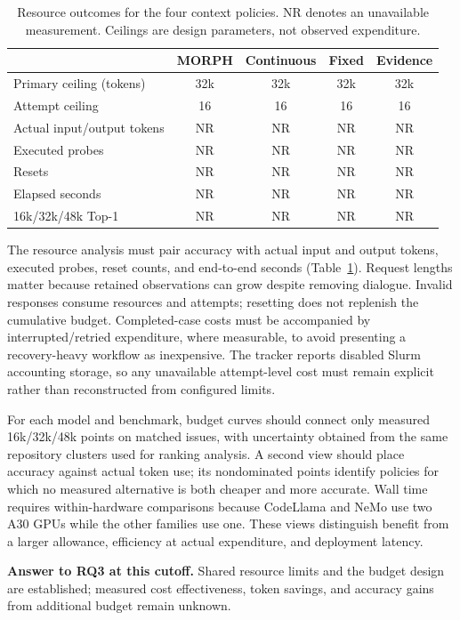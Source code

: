 \documentclass[letterpaper,journal]{IEEEtran}
\begin{document}
\begin{table}[t]
\caption{Resource outcomes for the four context policies. NR denotes an unavailable measurement. Ceilings are design parameters, not observed expenditure.}\label{tab:eval-cost}
\centering\scriptsize
\begin{tabular}{@{}lcccc@{}}\toprule
 & MORPH & Continuous & Fixed & Evidence\\\midrule
Primary ceiling (tokens) & 32k & 32k & 32k & 32k\\
Attempt ceiling & 16 & 16 & 16 & 16\\
Actual input/output tokens & NR & NR & NR & NR\\
Executed probes & NR & NR & NR & NR\\
Resets & NR & NR & NR & NR\\
Elapsed seconds & NR & NR & NR & NR\\
16k/32k/48k Top-1 & NR & NR & NR & NR\\\bottomrule
\end{tabular}
\end{table}

The resource analysis must pair accuracy with actual input and output tokens, executed probes, reset counts, and end-to-end seconds (Table~\ref{tab:eval-cost}). Request lengths matter because retained observations can grow despite removing dialogue. Invalid responses consume resources and attempts; resetting does not replenish the cumulative budget. Completed-case costs must be accompanied by interrupted/retried expenditure, where measurable, to avoid presenting a recovery-heavy workflow as inexpensive. The tracker reports disabled Slurm accounting storage, so any unavailable attempt-level cost must remain explicit rather than reconstructed from configured limits.

For each model and benchmark, budget curves should connect only measured 16k/32k/48k points on matched issues, with uncertainty obtained from the same repository clusters used for ranking analysis. A second view should place accuracy against actual token use; its nondominated points identify policies for which no measured alternative is both cheaper and more accurate. Wall time requires within-hardware comparisons because CodeLlama and NeMo use two A30 GPUs while the other families use one. These views distinguish benefit from a larger allowance, efficiency at actual expenditure, and deployment latency.

\noindent\textbf{Answer to RQ3 at this cutoff.} Shared resource limits and the budget design are established; measured cost effectiveness, token savings, and accuracy gains from additional budget remain unknown.
\end{document}
